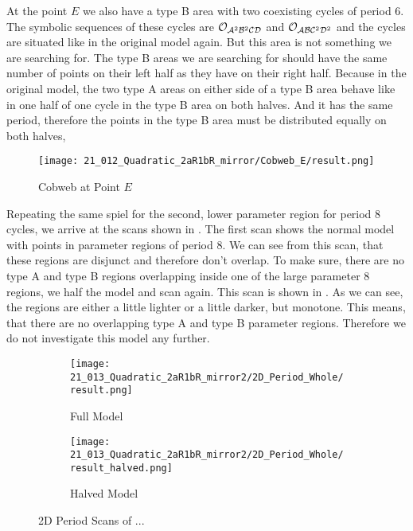 At the point $E$ we also have a type B area with two coexisting cycles of period 6.
The symbolic sequences of these cycles are $\mathcal{O}_{\mathcal{A}^2\mathcal{B}^2\mathcal{C}\mathcal{D}}$ and $\mathcal{O}_{\mathcal{A}\mathcal{B}\mathcal{C}^2\mathcal{D}^2}$ and the cycles are situated like in the original model again.
But this area is not something we are searching for.
The type B areas we are searching for should have the same number of points on their left half as they have on their right half.
Because in the original model, the two type A areas on either side of a type B area behave like in one half of one cycle in the type B area on both halves.
And it has the same period, therefore the points in the type B area must be distributed equally on both halves,

\begin{figure}
    \centering
    \texttt{[image: 21\_012\_Quadratic\_2aR1bR\_mirror/Cobweb\_E/result.png]}
    \caption{Cobweb at Point $E$}
    \label{fig:quadratic.full.2aR1bR_mirr.1.CobwebE}
\end{figure}

Repeating the same spiel for the second, lower parameter region for period 8 cycles, we arrive at the scans shown in .
The first scan shows the normal model with points in parameter regions of period 8.
We can see from this scan, that these regions are disjunct and therefore don't overlap.
To make sure, there are no type A and type B regions overlapping inside one of the large parameter 8 regions, we half the model and scan again.
This scan is shown in .
As we can see, the regions are either a little lighter or a little darker, but monotone.
This means, that there are no overlapping type A and type B parameter regions.
Therefore we do not investigate this model any further.

\begin{figure}
    \centering
    \begin{subfigure}{0.4\textwidth}
        \centering
        \texttt{[image: 21\_013\_Quadratic\_2aR1bR\_mirror2/2D\_Period\_Whole/result.png]}
        \caption{Full Model}
        \label{fig:quad.full.2aR1bR_cL_mirr.2.whole}
    \end{subfigure}
    \begin{subfigure}{0.4\textwidth}
        \centering
        \texttt{[image: 21\_013\_Quadratic\_2aR1bR\_mirror2/2D\_Period\_Whole/result\_halved.png]}
        \caption{Halved Model}
        \label{fig:quad.full.2aR1bR_cL_mirr.2.Halved}
    \end{subfigure}
    \caption{2D Period Scans of ...}
    \label{fig:quad.full.2aR1bR_cL_mirr.2.Period}
\end{figure}
